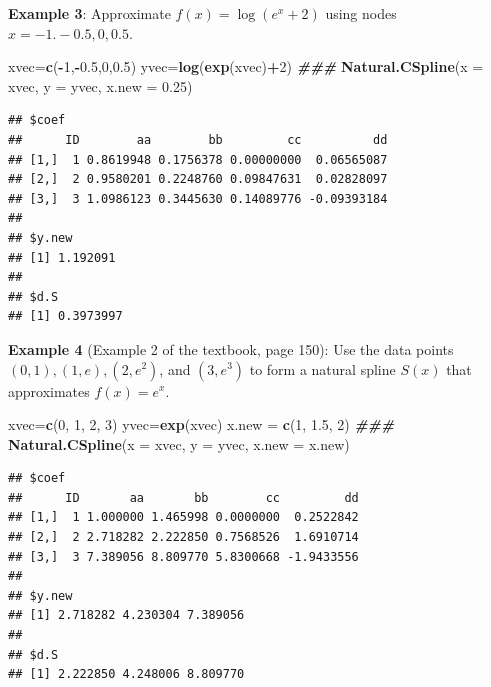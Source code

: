 \documentclass[
]{book}
\newenvironment{Shaded}{\begin{snugshade}}{\end{snugshade}}
\newcommand{\AttributeTok}[1]{\textcolor[rgb]{0.13,0.29,0.53}{#1}}
\newcommand{\DecValTok}[1]{\textcolor[rgb]{0.00,0.00,0.81}{#1}}
\newcommand{\DocumentationTok}[1]{\textcolor[rgb]{0.56,0.35,0.01}{\textbf{\textit{#1}}}}
\newcommand{\FloatTok}[1]{\textcolor[rgb]{0.00,0.00,0.81}{#1}}
\newcommand{\FunctionTok}[1]{\textcolor[rgb]{0.13,0.29,0.53}{\textbf{#1}}}
\newcommand{\NormalTok}[1]{#1}
\newcommand{\OtherTok}[1]{\textcolor[rgb]{0.56,0.35,0.01}{#1}}
\newcommand{\SpecialCharTok}[1]{\textcolor[rgb]{0.81,0.36,0.00}{\textbf{#1}}}
\begin{document}
\hfill\break

\textbf{Example 3}: Approximate \(f(x) = \log(e^x+2)\) using nodes \(x = -1. -0.5, 0, 0.5\).

\begin{Shaded}
\begin{Highlighting}[]
\NormalTok{xvec}\OtherTok{=}\FunctionTok{c}\NormalTok{(}\SpecialCharTok{{-}}\DecValTok{1}\NormalTok{,}\SpecialCharTok{{-}}\FloatTok{0.5}\NormalTok{,}\DecValTok{0}\NormalTok{,}\FloatTok{0.5}\NormalTok{)}
\NormalTok{yvec}\OtherTok{=}\FunctionTok{log}\NormalTok{(}\FunctionTok{exp}\NormalTok{(xvec)}\SpecialCharTok{+}\DecValTok{2}\NormalTok{)}
\DocumentationTok{\#\#\#}
\FunctionTok{Natural.CSpline}\NormalTok{(}\AttributeTok{x =}\NormalTok{ xvec, }\AttributeTok{y =}\NormalTok{ yvec, }\AttributeTok{x.new =} \FloatTok{0.25}\NormalTok{)}
\end{Highlighting}
\end{Shaded}

\begin{verbatim}
## $coef
##      ID        aa        bb         cc          dd
## [1,]  1 0.8619948 0.1756378 0.00000000  0.06565087
## [2,]  2 0.9580201 0.2248760 0.09847631  0.02828097
## [3,]  3 1.0986123 0.3445630 0.14089776 -0.09393184
## 
## $y.new
## [1] 1.192091
## 
## $d.S
## [1] 0.3973997
\end{verbatim}

\hfill\break

\textbf{Example 4} (Example 2 of the textbook, page 150): Use the data points \((0, 1), (1, e), (2, e^2)\), and \((3, e^3)\) to form a natural spline \(S(x)\) that approximates \(f(x) = e^x\).

\begin{Shaded}
\begin{Highlighting}[]
\NormalTok{xvec}\OtherTok{=}\FunctionTok{c}\NormalTok{(}\DecValTok{0}\NormalTok{, }\DecValTok{1}\NormalTok{, }\DecValTok{2}\NormalTok{, }\DecValTok{3}\NormalTok{)}
\NormalTok{yvec}\OtherTok{=}\FunctionTok{exp}\NormalTok{(xvec)}
\NormalTok{x.new }\OtherTok{=} \FunctionTok{c}\NormalTok{(}\DecValTok{1}\NormalTok{, }\FloatTok{1.5}\NormalTok{, }\DecValTok{2}\NormalTok{)}
\DocumentationTok{\#\#\#}
\FunctionTok{Natural.CSpline}\NormalTok{(}\AttributeTok{x =}\NormalTok{ xvec, }\AttributeTok{y =}\NormalTok{ yvec, }\AttributeTok{x.new =}\NormalTok{ x.new)}
\end{Highlighting}
\end{Shaded}

\begin{verbatim}
## $coef
##      ID       aa       bb        cc         dd
## [1,]  1 1.000000 1.465998 0.0000000  0.2522842
## [2,]  2 2.718282 2.222850 0.7568526  1.6910714
## [3,]  3 7.389056 8.809770 5.8300668 -1.9433556
## 
## $y.new
## [1] 2.718282 4.230304 7.389056
## 
## $d.S
## [1] 2.222850 4.248006 8.809770
\end{verbatim}
\end{document}
